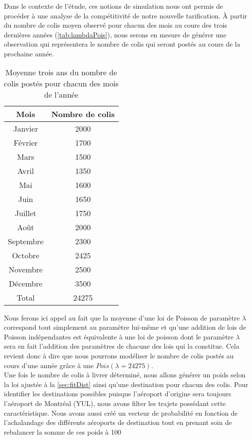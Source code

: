 Dans le contexte de l'étude, ces notions de simulation nous ont permis de procéder à une analyse de la compétitivité de notre nouvelle tarification. À partir du nombre de colis moyen observé pour chacun des mois au cours des trois dernières années (\autoref{tab:lambdaPois}), nous serons en mesure de générer une observation qui représentera le nombre de colis qui seront postés au cours de la prochaine année. \\

\begin{table}
	\centering
	\begin{tabular}{cc}
		Mois & Nombre de colis \\
		\hline
		Janvier & 2000 \\
		Février & 1700 \\
		Mars & 1500 \\
		Avril & 1350 \\
		Mai & 1600 \\
		Juin & 1650 \\
		Juillet & 1750 \\
		Août & 2000 \\
		Septembre & 2300 \\
		Octobre & 2425 \\
		Novembre & 2500 \\
		Décembre & 3500 \\
		\hline
		Total & 24275
	\end{tabular}
	\caption{Moyenne trois ans du nombre de colis postés pour chacun des mois de l'année}
	\label{tab:lambdaPois}
\end{table}

Nous ferons ici appel au fait que la moyenne d'une loi de Poisson de paramètre $\lambda$ correspond tout simplement au paramètre lui-même et qu'une addition de lois de Poisson indépendantes est équivalente à une loi de poisson dont le paramètre $\lambda$ sera en fait l'addition des paramètres de chacune des lois qui la constitue. Cela revient donc à dire que nous pourrons modéliser le nombre de colis postés au cours d'une année grâce à une $Pois(\lambda = 24275)$. \\

Une fois le nombre de colis à livrer déterminé, nous allons générer un poids selon la loi ajustée à la \autoref{sec:fitDist} ainsi qu'une destination pour chacun des colis. Pour identifier les destinations possibles puisque l'aéroport d'origine sera toujours l'aéroport de Montréal (YUL), nous avons filter les trajets possédant cette caractéristique. Nous avons aussi créé un vecteur de probabilité en fonction de l'achalandage des différents aéroports de destination tout en prenant soin de rebalancer  la somme de ces poids à 100%

